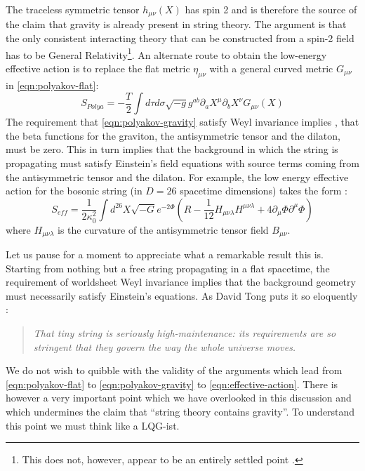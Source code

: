 \documentclass{ws-mpla}
\begin{document}
The traceless symmetric tensor $ h_{\mu\nu}(X) $ has spin 2 and is therefore the source of the claim that gravity is already present in string theory. The argument \cite{Boulware1975Classical} is that the only consistent interacting theory that can be constructed from a spin-2 field has to be General Relativity\footnote{This does not, however, appear to be an entirely settled point \cite{Padmanabhan2004From,Deser2009Gravity}.}. An alternate route to obtain the low-energy effective action is to replace the flat metric $ \eta_{\mu\nu} $ with a general curved metric $ G_{\mu\nu} $ in \eqref{eqn:polyakov-flat}:
\begin{equation}\label{eqn:polyakov-gravity}
		S_{Polya} = -\frac{T}{2} \int d\tau d\sigma \sqrt{-g} g^{ab} \partial_a X^\mu \partial_b X^\nu G_{\mu\nu}(X)
\end{equation}
The requirement that \eqref{eqn:polyakov-gravity} satisfy Weyl invariance implies \cite[Sec 3.7]{Polchinski1998aString}, \cite[Sec 7.2]{Tong2010Lectures} that the beta functions for the graviton, the antisymmetric tensor and the dilaton, must be zero. This in turn implies that the background in which the string is propagating must satisfy Einstein's field equations with source terms coming from the antisymmetric tensor and the dilaton. For example, the low energy effective action for the bosonic string (in $ D=26 $ spacetime dimensions) takes the form \cite{Tong2010Lectures}:
\begin{equation}\label{eqn:effective-action}
	S_{eff} = \frac{1}{2 \kappa^2_0} \int d^{26} X \sqrt{-G} e^{-2\Phi} \left( R - \frac{1}{12} H_{\mu\nu\lambda}H^{\mu\nu\lambda} + 4 \partial_\mu \Phi \partial^\mu \Phi \right)
\end{equation}
where $ H_{\mu\nu\lambda} $ is the curvature of the antisymmetric tensor field $ B_{\mu\nu} $.

Let us pause for a moment to appreciate what a remarkable result this is. Starting from nothing but a free string propagating in a flat spacetime, the requirement of worldsheet Weyl invariance implies that the background geometry must necessarily satisfy Einstein's equations. As David Tong puts it so eloquently \cite[pg. 175]{Tong2010Lectures}:
\begin{quote}
	\emph{That tiny string is seriously high-maintenance: its requirements are so stringent that they govern the way the whole universe moves.}
\end{quote}
We do not wish to quibble with the validity of the arguments which lead from \eqref{eqn:polyakov-flat} to \eqref{eqn:polyakov-gravity} to \eqref{eqn:effective-action}. There is however a very important point which we have overlooked in this discussion and which undermines the claim that ``string theory contains gravity''. To understand this point we must think like a LQG-ist.
\end{document}
